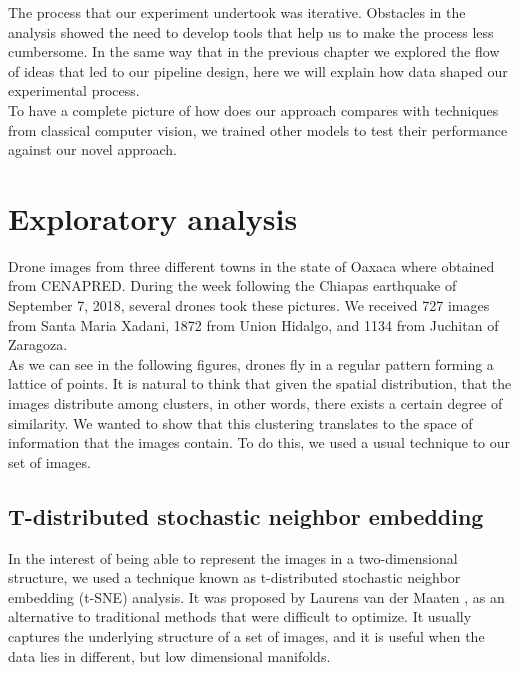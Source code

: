 The process that our experiment undertook was iterative. Obstacles in the analysis showed the need to develop tools that help us to make the process less cumbersome. In the same way that in the previous chapter we explored the flow of ideas that led to our pipeline design, here we will explain how data shaped our experimental process.\\

To have a complete picture of how does our approach compares with techniques from classical computer vision, we trained other models to test their performance against our novel approach.\\

\section{Exploratory analysis}

Drone images from three different towns in the state of Oaxaca where obtained from CENAPRED. During the week following the Chiapas earthquake of September 7, 2018, several drones took these pictures. We received 727 images from Santa Maria Xadani, 1872 from Union Hidalgo, and 1134 from Juchitan of Zaragoza.\\

As we can see in the following figures, drones fly in a regular pattern forming a lattice of points. It is natural to think that given the spatial distribution, that the images distribute among clusters, in other words, there exists a certain degree of similarity. We wanted to show that this clustering translates to the space of information that the images contain. To do this, we used a usual technique to our set of images.\\

\subsection{T-distributed stochastic neighbor embedding}

In the interest of being able to represent the images in a two-dimensional structure, we used a technique known as t-distributed stochastic neighbor embedding (t-SNE) analysis. It was proposed by Laurens van der Maaten \cite{t-sne}, as an alternative to traditional methods that were difficult to optimize. It usually captures the underlying structure of a set of images, and it is useful when the data lies in different, but low dimensional manifolds.\\

